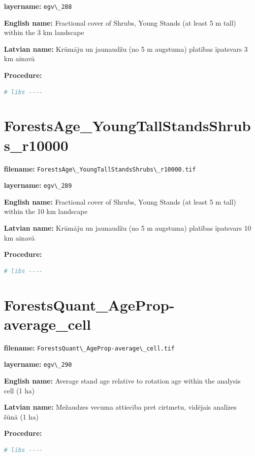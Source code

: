 \documentclass[
]{book}
\newcommand{\passthrough}[1]{#1}
\begin{document}
\textbf{layername:} \passthrough{\lstinline!egv\_288!}

\textbf{English name:} Fractional cover of Shrubs, Young Stands (at least 5 m tall) within the 3 km landscape

\textbf{Latvian name:} Krūmāju un jaunaudžu (no 5 m augstuma) platības īpatsvars 3 km ainavā

\textbf{Procedure:}

\begin{lstlisting}[language=R]
# libs ----
\end{lstlisting}

\section{ForestsAge\_YoungTallStandsShrubs\_r10000}\label{ch06.289}

\textbf{filename:} \passthrough{\lstinline!ForestsAge\_YoungTallStandsShrubs\_r10000.tif!}

\textbf{layername:} \passthrough{\lstinline!egv\_289!}

\textbf{English name:} Fractional cover of Shrubs, Young Stands (at least 5 m tall) within the 10 km landscape

\textbf{Latvian name:} Krūmāju un jaunaudžu (no 5 m augstuma) platības īpatsvars 10 km ainavā

\textbf{Procedure:}

\begin{lstlisting}[language=R]
# libs ----
\end{lstlisting}

\section{ForestsQuant\_AgeProp-average\_cell}\label{ch06.290}

\textbf{filename:} \passthrough{\lstinline!ForestsQuant\_AgeProp-average\_cell.tif!}

\textbf{layername:} \passthrough{\lstinline!egv\_290!}

\textbf{English name:} Average stand age relative to rotation age within the analysis cell (1 ha)

\textbf{Latvian name:} Mežaudzes vecuma attiecība pret cirtmetu, vidējais analīzes šūnā (1 ha)

\textbf{Procedure:}

\begin{lstlisting}[language=R]
# libs ----
\end{lstlisting}
\end{document}
